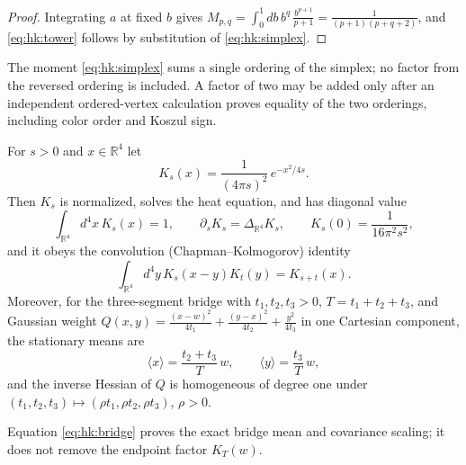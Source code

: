\begin{proof}
Integrating $a$ at fixed $b$ gives
$M_{p,q}=\int_0^1 db\,b^q\,\frac{b^{p+1}}{p+1}=\frac{1}{(p+1)(p+q+2)}$,
and \eqref{eq:hk:tower} follows by substitution of \eqref{eq:hk:simplex}.
\end{proof}

\begin{remark}
\label{rem:hk:factortwo}
The moment \eqref{eq:hk:simplex} sums a single ordering of the simplex; no
factor from the reversed ordering is included. A factor of two may be added
only after an independent ordered-vertex calculation proves equality of the
two orderings, including color order and Koszul sign.
\end{remark}

\begin{lemma}\label{lem:hk:gaussian}
For $s>0$ and $x\in\mathbb R^4$ let
\begin{equation}\label{eq:hk:kernel}
K_s(x)=\frac{1}{(4\pi s)^2}\,e^{-x^2/4s} .
\end{equation}
Then $K_s$ is normalized, solves the heat equation, and has diagonal value
\begin{equation}\label{eq:hk:heateq}
\int_{\mathbb R^4} d^4x\,K_s(x)=1,\qquad
\partial_s K_s=\Delta_{\mathbb R^4}K_s,\qquad
K_s(0)=\frac{1}{16\pi^2 s^2} ,
\end{equation}
and it obeys the convolution (Chapman--Kolmogorov) identity
\begin{equation}\label{eq:hk:conv}
\int_{\mathbb R^4} d^4y\,K_s(x-y)K_t(y)=K_{s+t}(x) .
\end{equation}
Moreover, for the three-segment bridge with $t_1,t_2,t_3>0$,
$T=t_1+t_2+t_3$, and Gaussian weight
$Q(x,y)=\frac{(x-w)^2}{4t_1}+\frac{(y-x)^2}{4t_2}+\frac{y^2}{4t_3}$ in one
Cartesian component, the stationary means are
\begin{equation}\label{eq:hk:bridge}
\langle x\rangle=\frac{t_2+t_3}{T}\,w,\qquad
\langle y\rangle=\frac{t_3}{T}\,w ,
\end{equation}
and the inverse Hessian of $Q$ is homogeneous of degree one under
$(t_1,t_2,t_3)\mapsto(\rho t_1,\rho t_2,\rho t_3)$, $\rho>0$.
\end{lemma}

\begin{remark}
Equation \eqref{eq:hk:bridge} proves the exact bridge mean and covariance
scaling; it does not remove the endpoint factor $K_T(w)$.
\end{remark}

